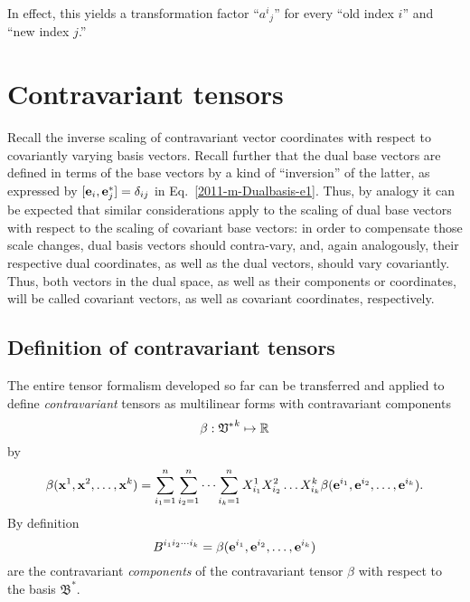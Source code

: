 In effect, this yields a transformation factor ``${a^i}_j$'' for every ``old index $i$'' and ``new index $j$.''



\section{Contravariant tensors}

Recall the inverse scaling of contravariant vector coordinates with respect to covariantly varying basis vectors.
Recall further that the dual base vectors are defined in terms of the base vectors by
a kind of ``inversion'' of the latter, as expressed by $[{\bf e}_i,  {\bf e}_j^*]=\delta_{ij}$
in Eq.~\ref{2011-m-Dualbasis-e1}.
Thus, by analogy it can be expected that similar considerations apply to
the scaling of dual base vectors with respect to the scaling of covariant base vectors:
in order to compensate those scale changes, dual basis vectors should contra-vary,
and, again analogously,  their respective dual coordinates, as well as the dual vectors,
should vary covariantly.
Thus, both vectors in the dual space, as well as their components or coordinates, will be called covariant vectors,
as well as covariant coordinates, respectively.



\subsection{Definition of contravariant tensors}

The entire tensor formalism developed so far can be transferred and applied to define {\em contravariant} tensors
as multilinear forms with contravariant components
\begin{equation}
\beta:{ \frak V^\ast }^k \mapsto {\Bbb R}
\end{equation}
by
\begin{equation}
\beta ( {\bf x}^1,{\bf x}^2,\ldots ,{\bf x}^k)=
\sum_{i_1=1}^n
\sum_{i_2=1}^n
\cdots
\sum_{i_k=1}^n
X_{i_1}^1 X_{i_2}^2 \ldots X_{i_k}^k
\beta ( {\bf e}^{i_1},{\bf e}^{i_2},\ldots ,{\bf e}^{i_k}).
\end{equation}
By definition
\begin{equation}
B^{{i_1}{i_2}\cdots {i_k}}=\beta ( {\bf e}^{i_1},{\bf e}^{i_2},\ldots ,{\bf e}^{i_k})
\label{2011-m-tvtcontrav}
\end{equation}
 are the contravariant
{\em components} of the contravariant tensor $\beta $ with respect to the basis
${\mathfrak B}^\ast$.








